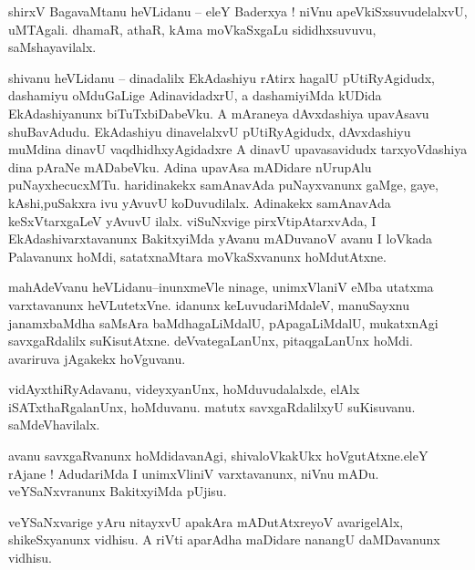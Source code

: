 \documentclass{article}
\begin{document}
\begin{mn}%
shirxV BagavaMtanu heVLidanu -- eleY Baderxya ! niVnu apeVkiSxsuvudelalxvU, uMTAgali. dhamaR, 
athaR, kAma moVkaSxgaLu sididhxsuvuvu, saMshayavilalx.
\end{mn}

\begin{mn}%
shivanu heVLidanu -- dinadalilx EkAdashiyu rAtirx hagalU pUtiRyAgidudx, dashamiyu oMduGaLige 
AdinavidadxrU, a dashamiyiMda kUDida EkAdashiyanunx biTuTxbiDabeVku. A mAraneya dAvxdashiya 
upavAsavu shuBavAdudu. EkAdashiyu dinavelalxvU pUtiRyAgidudx, dAvxdashiyu muMdina dinavU 
vaqdhidhxyAgidadxre A dinavU upavasavidudx tarxyoVdashiya dina pAraNe mADabeVku. Adina upavAsa 
mADidare nUrupAlu puNayxhecucxMTu. haridinakekx samAnavAda puNayxvanunx gaMge, gaye, 
kAshi,puSakxra ivu yAvuvU koDuvudilalx. Adinakekx samAnavAda keSxVtarxgaLeV yAvuvU ilalx. 
viSuNxvige pirxVtipAtarxvAda, I EkAdashivarxtavanunx BakitxyiMda yAvanu mADuvanoV avanu I loVkada 
Palavanunx hoMdi, satatxnaMtara moVkaSxvanunx hoMdutAtxne.
\end{mn}


\begin{mn}%
mahAdeVvanu heVLidanu--inunxmeVle ninage, unimxVlaniV eMba utatxma varxtavanunx heVLutetxVne. 
idanunx keLuvudariMdaleV, manuSayxnu janamxbaMdha saMsAra baMdhagaLiMdalU, pApagaLiMdalU, 
mukatxnAgi savxgaRdalilx suKisutAtxne. deVvategaLanUnx, pitaqgaLanUnx hoMdi. avariruva jAgakekx 
hoVguvanu.
\end{mn}

\begin{mn}%
vidAyxthiRyAdavanu, videyxyanUnx, hoMduvudalalxde, elAlx iSATxthaRgalanUnx, hoMduvanu. matutx 
savxgaRdalilxyU suKisuvanu. saMdeVhavilalx.
\end{mn}

\begin{mn}%
avanu savxgaRvanunx hoMdidavanAgi, shivaloVkakUkx hoVgutAtxne.eleY rAjane ! AdudariMda I 
unimxVliniV varxtavanunx, niVnu mADu. veYSaNxvranunx BakitxyiMda pUjisu.
\end{mn}

\begin{mn}%
veYSaNxvarige yAru nitayxvU apakAra mADutAtxreyoV avarigelAlx, shikeSxyanunx vidhisu. A riVti 
aparAdha maDidare nanangU daMDavanunx vidhisu.
\end{mn}
\end{document}
